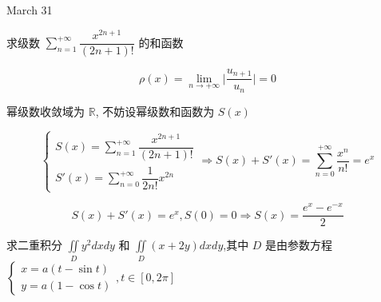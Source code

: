 \textcolor{purplea}{March 31}

\begin{example}[][Exam: 29.4.18]
	求级数 $\sum\limits_{n=1}^{+\infty}\dfrac{x^{2n+1}}{(2n+1)!}$ 的和函数
\end{example}

\begin{solution}
	
	$$\rho(x) = \lim\limits_{n \to +\infty} \big|\dfrac{u_{n+1}}{u_{n}}\big| = 0$$

	幂级数收敛域为 $\mathbb{R}$, 不妨设幂级数和函数为 $S(x)$

	$$\begin{cases}
	  S(x) = \sum\limits_{n=1}^{+\infty}\dfrac{x^{2n+1}}{(2n+1)!}\\
	  S'(x) = \sum\limits_{n=0}^{+\infty}\dfrac{1}{2n!}x^{2n}
	\end{cases}\Rightarrow
	S(x) + S'(x) = \sum\limits_{n=0}^{+\infty}\dfrac{x^{n}}{n!} = e^{x}$$

	$$S(x) + S'(x) = e^{x}, S(0) = 0\Rightarrow S(x) = \dfrac{e^{x}-e^{-x}}{2}$$

\end{solution}

\begin{example}[][Exam: 29.4.19]
	求二重积分 $\iint\limits_{D}y^2dxdy$ 和 $\iint\limits_{D}(x+2y)dxdy$,其中 $D$ 是由参数方程 $
	\begin{cases}
		x=a(t-\sin t)\\
		y=a(1-\cos t)
	\end{cases},t\in [0,2\pi]$
\end{example}

